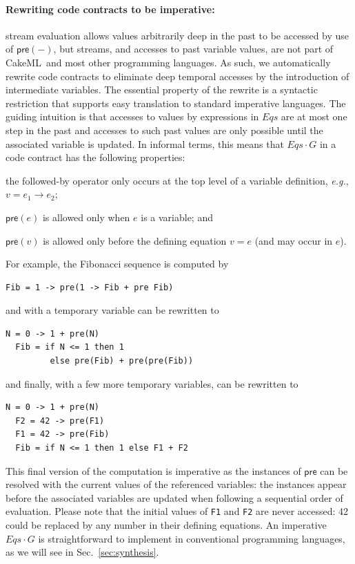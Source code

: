 \documentclass[global,twocolumn]{svjour}
\newcommand{\konst}[1]{\ensuremath{\mathsf{#1}}}
\newcommand{\Eqs}{\ensuremath{\mathit{Eqs}}}
\newcommand{\secref}[1]{Sec.~\ref{#1}}
\newcommand{\ckml}{CakeML}
\newcommand{\eg}{\textit{e.g.}}
\begin{document}
\paragraph{Rewriting code contracts to be imperative:\/} stream evaluation allows values arbitrarily deep in the past to be accessed by use of $\konst{pre}(-)$, but streams, and accesses to past variable values, are not part of \ckml\ and most other programming languages.
%
As such, we automatically rewrite code contracts to eliminate deep temporal accesses by the introduction of intermediate variables.
%
The essential property of the rewrite is a syntactic restriction that supports easy translation to standard imperative languages.
%
The guiding intuition is that accesses to values by expressions in {\Eqs} are at most one step in the past and accesses to such past values are only possible until the associated variable is updated.
%
In informal terms, this means that ${\Eqs} \cdot G$ in a code contract has the following properties:
%
\begin{compactitem}
\item the followed-by operator only occurs at the top level of a variable definition, \eg, $v = e_1 \to e_2$;
\item $\konst{pre}(e)$ is allowed only when $e$ is a variable; and
\item $\konst{pre}(v)$ is allowed only before the defining equation $v = e$ (and may occur in $e$).
\end{compactitem}


For example, the Fibonacci sequence is computed by
%
{\small
\begin{lstlisting}[style=agree]
  Fib = 1 -> pre(1 -> Fib + pre Fib)
\end{lstlisting}
}
%
\noindent and with a temporary variable can be rewritten to
%
{\small
\begin{lstlisting}[style=agree]
  N = 0 -> 1 + pre(N)
  Fib = if N <= 1 then 1
         else pre(Fib) + pre(pre(Fib))
\end{lstlisting}
}
%
\noindent and finally, with a few more temporary variables, can be rewritten to
%
{\small
\begin{lstlisting}[style=agree]
  N = 0 -> 1 + pre(N)
  F2 = 42 -> pre(F1)
  F1 = 42 -> pre(Fib)
  Fib = if N <= 1 then 1 else F1 + F2
\end{lstlisting}
}
%
\noindent This final version of the computation is imperative as the instances of $\konst{pre}$ can be resolved with the current values of the referenced variables:
%
the instances appear before the associated variables are updated when following a sequential order of evaluation.
%
Please note that the initial values of \verb+F1+ and \verb+F2+ are never accessed: 42 could be replaced by any number in their defining equations.
%
An imperative ${\Eqs} \cdot G$ is straightforward to implement in conventional programming languages, as we will see in \secref{sec:synthesis}.
\end{document}
